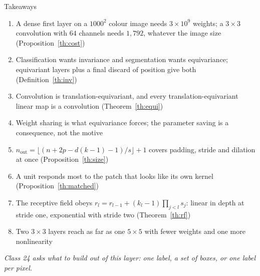 \documentclass[aspectratio=169, 11pt]{beamer}
\newcommand{\bridge}[1]{%
  {\scriptsize\itshape\color{mcMuted} #1\par}\vspace{0.35em}}
\newcommand{\nosrc}{}       %
\begin{document}
\begin{frame}{Takeaways}
  \nosrc
  \vspace{-0.05em}
  {\scriptsize
  \begin{enumerate}\itemsep0.30em
    \item A dense first layer on a $1000^2$ colour image needs
          $3 \times 10^9$ weights; a $3\times3$ convolution with $64$
          channels needs $1{,}792$, whatever the image size
          (Proposition~\ref{th:cost})
    \item Classification wants invariance and segmentation wants
          equivariance; equivariant layers plus a final discard of
          position give both (Definition~\ref{th:inv})
    \item Convolution is translation-equivariant, and every
          translation-equivariant linear map is a convolution
          (Theorem~\ref{th:equi})
    \item Weight sharing is what equivariance forces; the parameter
          saving is a consequence, not the motive
    \item $n_{\mathrm{out}} = \lfloor (n + 2p - d(k-1) - 1)/s \rfloor + 1$
          covers padding, stride and dilation at once
          (Proposition~\ref{th:size})
    \item A unit responds most to the patch that looks like its own
          kernel (Proposition~\ref{th:matched})
    \item The receptive field obeys
          $r_l = r_{l-1} + (k_l-1)\prod_{j<l} s_j$: linear in depth at
          stride one, exponential with stride two
          (Theorem~\ref{th:rf})
    \item Two $3\times3$ layers reach as far as one $5\times5$ with
          fewer weights and one more nonlinearity
  \end{enumerate}}
  \bridge{Class 24 asks what to build out of this layer: one label, a
  set of boxes, or one label per pixel.}
\end{frame}
\end{document}
